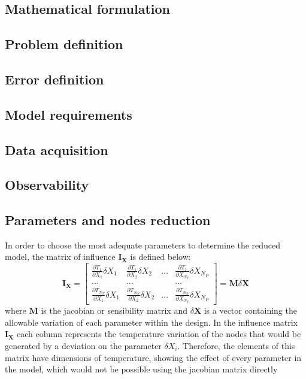 \begin{itemize}
\chapter{Mathematical formulation}
\section{Problem definition}
\section{Error definition}
\section{Model requirements}
\section{Data acquisition}
\section{Observability}
\section{Parameters and nodes reduction}
In order to choose the most adequate parameters to determine the reduced model, the matrix of influence $\mathbf{I}_{\mathbf{X}}$ is defined below:
\begin{equation}
\mathbf{I}_{\mathbf{X}}=\left[\begin{array}{cccc}
\frac{\partial T_1}{\partial X_1} \delta X_1 & \frac{\partial T_1}{\partial X_2} \delta X_2 & \ldots & \frac{\partial T_1}{\partial X_{N_P}} \delta X_{N_P} \\
\ldots & \ldots & & \ldots \\
\frac{\partial T_{N_N}}{\partial X_1} \delta X_1 & \frac{\partial T_{N_N}}{\partial X_2} \delta X_2 & \ldots & \frac{\partial T_{N_N}}{\partial X_{N_P}} \delta X_{N_P}
\end{array}\right]=\mathbf{M} \delta \boldsymbol{X}
\end{equation}
where $\mathbf{M}$ is the jacobian or sensibility matrix and $ \delta \boldsymbol{X}$ is a vector containing the allowable variation of each parameter within the design. In the influence matrix $\mathbf{I}_{\mathbf{X}}$ each column represents the temperature variation of the nodes that would be generated by a deviation on the parameter $ \delta X_i$. Therefore, the elements of this matrix have dimensions of temperature, showing the effect of every parameter in the model, which would not be possible using the jacobian matrix directly

\end{itemize}
